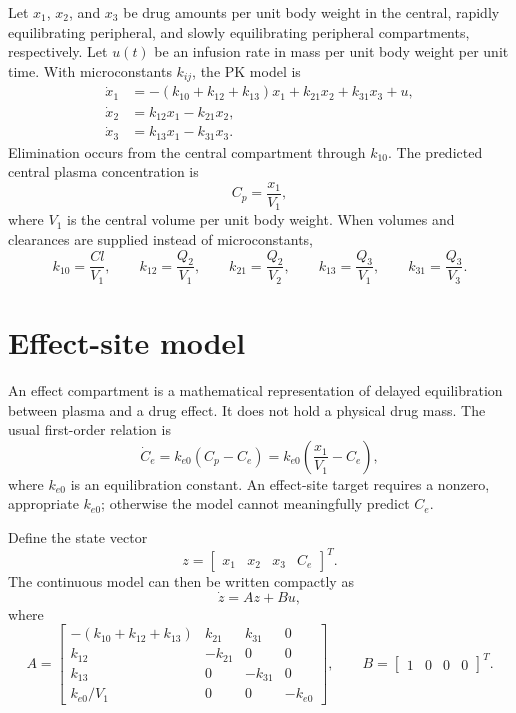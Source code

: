 \documentclass[11pt]{article}
\begin{document}
Let $x_1$, $x_2$, and $x_3$ be drug amounts per unit body weight in the central, rapidly equilibrating peripheral, and slowly equilibrating peripheral compartments, respectively. Let $u(t)$ be an infusion rate in mass per unit body weight per unit time. With microconstants $k_{ij}$, the PK model is
\begin{align}
 \dot{x}_1 &= -(k_{10}+k_{12}+k_{13})x_1 + k_{21}x_2 + k_{31}x_3 + u, \\
 \dot{x}_2 &= k_{12}x_1-k_{21}x_2, \\
 \dot{x}_3 &= k_{13}x_1-k_{31}x_3.
\end{align}
Elimination occurs from the central compartment through $k_{10}$. The predicted central plasma concentration is
\begin{equation}
 C_p = \frac{x_1}{V_1},
\end{equation}
where $V_1$ is the central volume per unit body weight. When volumes and clearances are supplied instead of microconstants,
\begin{equation}
 k_{10}=\frac{Cl}{V_1},\qquad k_{12}=\frac{Q_2}{V_1},\qquad k_{21}=\frac{Q_2}{V_2},\qquad
 k_{13}=\frac{Q_3}{V_1},\qquad k_{31}=\frac{Q_3}{V_3}.
\end{equation}

\section{Effect-site model}

An effect compartment is a mathematical representation of delayed equilibration between plasma and a drug effect. It does not hold a physical drug mass. The usual first-order relation is
\begin{equation}
 \dot{C}_e = k_{e0}(C_p-C_e)=k_{e0}\left(\frac{x_1}{V_1}-C_e\right),
\end{equation}
where $k_{e0}$ is an equilibration constant. An effect-site target requires a nonzero, appropriate $k_{e0}$; otherwise the model cannot meaningfully predict $C_e$.

Define the state vector
\begin{equation}
 z = \begin{bmatrix}x_1 & x_2 & x_3 & C_e\end{bmatrix}^{T}.
\end{equation}
The continuous model can then be written compactly as
\begin{equation}
 \dot{z}=Az+Bu,
\end{equation}
where
\begin{equation}
 A=
 \begin{bmatrix}
 -(k_{10}+k_{12}+k_{13}) & k_{21} & k_{31} & 0 \\
 k_{12} & -k_{21} & 0 & 0 \\
 k_{13} & 0 & -k_{31} & 0 \\
 k_{e0}/V_1 & 0 & 0 & -k_{e0}
 \end{bmatrix},
 \qquad
 B=\begin{bmatrix}1 & 0 & 0 & 0\end{bmatrix}^{T}.
\end{equation}
\end{document}
